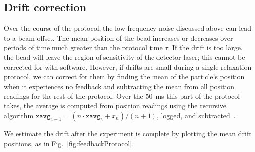 \documentclass[hyperref={colorlinks=true, urlcolor=blue, citecolor=blue, final, bound}]{sfuthesis}
\begin{document}
\subsection{Drift correction}
Over the course of the protocol, the low-frequency noise discussed above can lead to a beam offset. The mean position of the bead increases or decreases over periods of time much greater than the protocol time $\tau$. If the drift is too large, the bead will leave the region of sensitivity of the detector laser; this cannot be corrected for with software. However, if drifts are small during a single relaxation protocol, we can correct for them by finding the mean of the particle's position when it experiences no feedback and subtracting the mean from all position readings for the rest of the protocol. Over the \qty{50}{\milli\second} this part of the protocol takes, the average is computed from position readings using the recursive algorithm $\mathtt{xavg}_{n+1} = (n\cdot\mathtt{xavg}_n + x_n)/(n+1)$, logged, and subtracted~\cite[Eq.~8.27]{Bechhoefer2021}. 

We estimate the drift after the experiment is complete by plotting the mean drift positions, as in Fig.~\ref{fig:feedbackProtocol}. 
\end{document}
